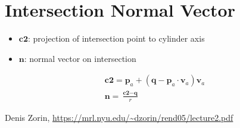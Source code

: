 \documentclass[a4paper, 12pt]{article}
\begin{document}
\section{Intersection Normal Vector}
\begin{itemize}
\item $\textbf{c2}$: projection of intersection point to cylinder axis
\item $\textbf{n}$: normal vector on intersection
\end{itemize}	

\begin{align*}
\textbf{c2} =  \textbf{p}_a + (\textbf{q}- \textbf{p}_a \cdot \textbf{v}_a) \textbf{v}_a
\\
\textbf{n} = \frac{\textbf{c2}-\textbf{q}}{ r} 
\end{align*}






\begin{thebibliography}{10} %
   Denis Zorin, \url{https://mrl.nyu.edu/~dzorin/rend05/lecture2.pdf}%

\end{thebibliography}
\end{document}
